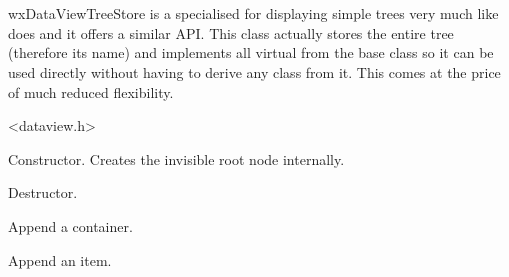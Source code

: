 
\section{}\label{wxdataviewtreestore}

wxDataViewTreeStore is a specialised 
for displaying simple trees very much like 
does and it offers a similar API. This class actually stores the entire
tree (therefore its name) and implements all virtual from the base class
so it can be used directly without having to derive any class from it.
This comes at the price of much reduced flexibility.




<dataview.h>

\label{wxdataviewtreestorewxdataviewtreestore}


Constructor. Creates the invisible root node internally.

\label{wxdataviewtreestoredtor}


Destructor.

\label{wxdataviewtreestoreappendcontainer}


Append a container.

\label{wxdataviewtreestoreappenditem}


Append an item.

\label{wxdataviewtreestoredeleteallitems}

